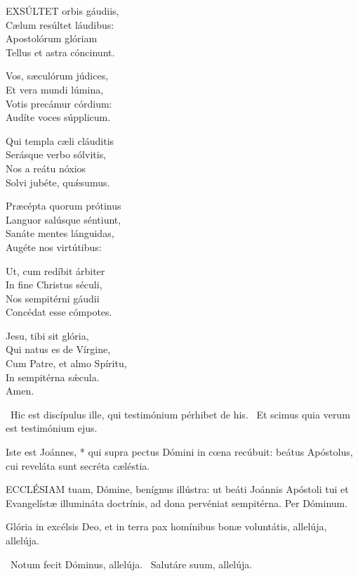 
\lettrine[lines=2]{E}{XSÚLTET} orbis gáudiis,\\
Cælum resúltet láudibus:\\
Apostolórum glóriam\\
Tellus et astra cóncinunt.

Vos, sæculórum júdices,\\
Et vera mundi lúmina,\\
Votis precámur córdium:\\
Audíte voces súpplicum.

Qui templa cæli cláuditis\\
Serásque verbo sólvitis,\\
Nos a reátu nóxios\\
Solvi jubéte, quǽsumus.

Præcépta quorum prótinus\\
Languor salúsque séntiunt,\\
Sanáte mentes lánguidas,\\
Augéte nos virtútibus:

Ut, cum redíbit árbiter\\
In fine Christus séculi,\\
Nos sempitérni gáudii\\
Concédat esse cómpotes.

Jesu, tibi sit glória,\\
Qui natus es de Vírgine,\\
Cum Patre, et almo Spíritu,\\
In sempitérna sǽcula.\\
Amen.

\V\ Hic est discípulus ille, qui testimónium pérhibet de his. \R\ Et scimus quia verum est testimónium ejus.

 Iste est Joánnes, * qui supra pectus Dómini in cœna recúbuit: beátus Apóstolus, cui reveláta sunt secréta cæléstia.


\lettrine[lines=2]{E}{CCLÉSIAM} tuam, Dómine, benígnus illústra: ut beáti Joánnis Apóstoli tui et Evangelístæ illumináta doctrínis, ad dona pervéniat sempitérna. Per Dóminum.


 Glória in excélsis Deo, et in terra pax homínibus bonæ voluntátis, allelúja, allelúja.

\V\ Notum fecit Dóminus, allelúja. \R\ Salutáre suum, allelúja.

